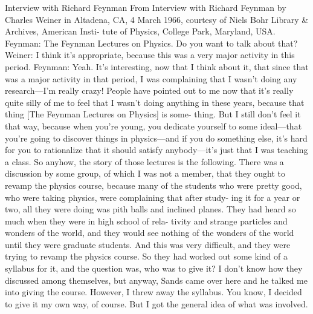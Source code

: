 \documentclass[11pt,oneside]{article}
\begin{document}
Interview with Richard Feynman From Interview with Richard Feynman by Charles Weiner in Altadena, CA, 4 March 1966, courtesy of Niels Bohr Library \& Archives, American Insti- tute of Physics, College Park, Maryland, USA. Feynman: The Feynman Lectures on Physics. Do you want to talk about that? Weiner: I think it’s appropriate, because this was a very major activity in this period. Feynman: Yeah. It’s interesting, now that I think about it, that since that was a major activity in that period, I was complaining that I wasn’t doing any research---I’m really crazy! People have pointed out to me now that it’s really quite silly of me to feel that I wasn’t doing anything in these years, because that thing [The Feynman Lectures on Physics] is some- thing. But I still don’t feel it that way, because when you’re young, you dedicate yourself to some ideal---that you’re going to discover things in physics---and if you do something else, it’s hard for you to rationalize that it should satisfy anybody---it’s just that I was teaching a class. So anyhow, the story of those lectures is the following. There was a discussion by some group, of which I was not a member, that they ought to revamp the physics course, because many of the students who were pretty good, who were taking physics, were complaining that after study- ing it for a year or two, all they were doing was pith balls and inclined planes. They had heard so much when they were in high school of rela- tivity and strange particles and wonders of the world, and they would see nothing of the wonders of the world until they were graduate students. And this was very difficult, and they were trying to revamp the physics course. So they had worked out some kind of a syllabus for it, and the question was, who was to give it? I don’t know how they discussed among themselves, but anyway, Sands came over here and he talked me into giving the course. However, I threw away the syllabus. You know, I decided to give it my own way, of course. But I got the general idea of what was involved.\par
\end{document}
